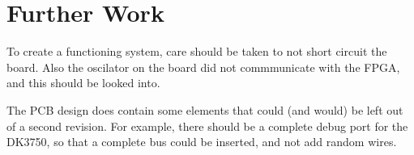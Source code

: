 \section{Further Work}
To create a functioning system, care should be taken to not short circuit the board.
Also the oscilator on the board did not commmunicate with the FPGA, and this should be looked into.

The PCB design does contain some elements that could (and would) be left out of a second revision.
For example, there should be a complete debug port for the DK3750, so that a complete bus could be inserted, and not add random wires.


